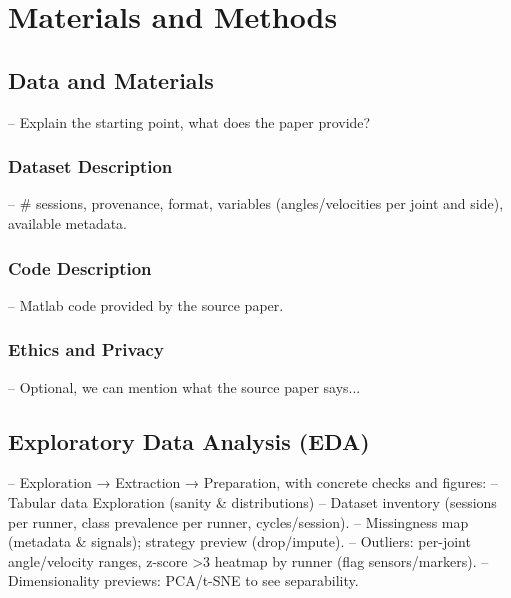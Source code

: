 \chapter{Materials and Methods}\label{chap:materials-methods}

\section{Data and Materials}\label{sec:method-data-materials}
-- Explain the starting point, what does the paper provide?

\subsection{Dataset Description}\label{subsec:method-dataset-description}
-- # sessions, provenance, format, variables (angles/velocities per joint and side), available metadata.

\subsection{Code Description}\label{subsec:method-code-description}
-- Matlab code provided by the source paper.



\subsection{Ethics and Privacy}\label{subsec:method-ethics}
-- Optional, we can mention what the source paper says...

\section{Exploratory Data Analysis (EDA)}\label{sec:method-eda}
-- Exploration → Extraction → Preparation, with concrete checks and figures:
-- Tabular data Exploration (sanity & distributions)
-- Dataset inventory (sessions per runner, class prevalence per runner, cycles/session).
-- Missingness map (metadata & signals); strategy preview (drop/impute).
-- Outliers: per-joint angle/velocity ranges, z-score >3 heatmap by runner (flag sensors/markers).
-- Dimensionality previews: PCA/t-SNE to see separability.



